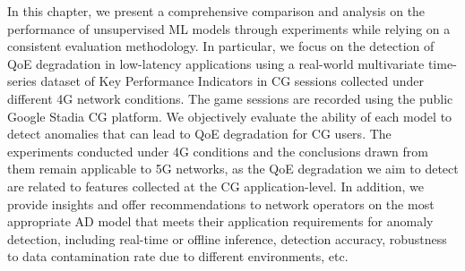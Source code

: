 In this chapter, we present a comprehensive comparison and analysis on the performance of unsupervised ML models through experiments while relying on a consistent evaluation methodology. In particular, we focus on the detection of QoE degradation in low-latency applications using a real-world multivariate time-series dataset of Key Performance Indicators in CG sessions collected under different 4G network conditions. The game sessions are recorded using the public Google Stadia CG platform. We objectively evaluate the ability of each model to detect anomalies that can lead to QoE degradation for CG users. The experiments conducted under 4G conditions and the conclusions drawn from them remain applicable to 5G networks, as the QoE degradation we aim to detect are related to features collected at the CG application-level.
In addition, we provide insights and offer recommendations to network operators on the most appropriate AD model that meets their application requirements for anomaly detection, including real-time or offline inference, detection accuracy, robustness to data contamination rate due to different environments, etc. 



